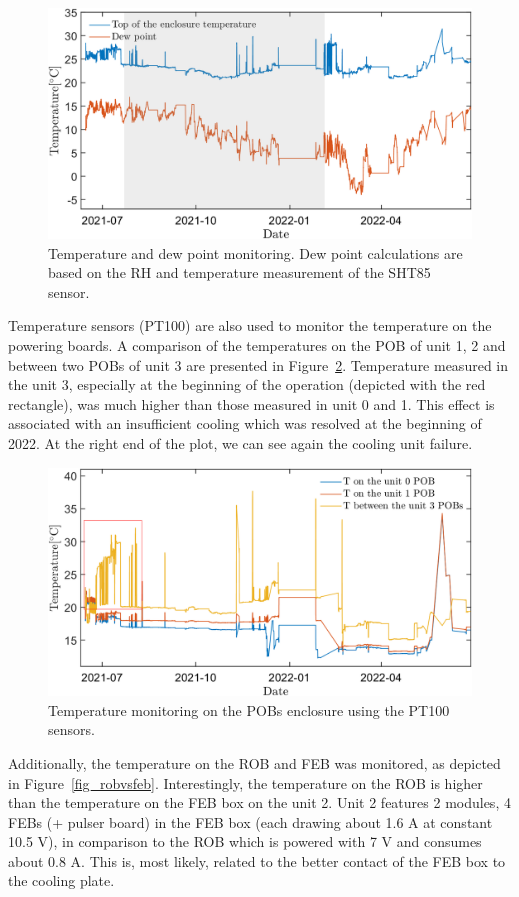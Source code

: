\begin{figure}[!h]
\centering
\includegraphics[width=0.9\columnwidth]{Chapter6/DCS/images/dew.png}
\caption{Temperature and dew point monitoring. Dew point calculations are based on the \gls{RH} and temperature measurement of the SHT85 sensor.}
\label{fig_dew}
\end{figure}


Temperature sensors (PT100) are also used to monitor the temperature on the powering boards. A comparison of the temperatures on the \gls{POB} of unit 1, 2 and between two \glspl{POB} of unit 3 are presented in Figure~\ref{fig_POB1}. Temperature measured in the unit 3, especially at the beginning of the operation (depicted with the red rectangle), was much higher than those measured in unit 0 and 1. This effect is associated with an insufficient cooling which was resolved at the beginning of 2022. At the right end of the plot, we can see again the cooling unit failure. 
\begin{figure}[!h]
\centering
\includegraphics[width=0.9\columnwidth]{Chapter6/DCS/images/POB1.png}
\caption{Temperature monitoring on the \glspl{POB} enclosure using the PT100 sensors.}
\label{fig_POB1}
\end{figure}

Additionally, the temperature on the \gls{ROB} and \gls{FEB} was monitored, as depicted in Figure~\ref{fig_robvsfeb}. Interestingly, the temperature on the \gls{ROB} is higher than the temperature on the \gls{FEB} box on the unit 2. Unit 2 features 2 modules, 4 \gls{FEB}s (+ pulser board) in the \gls{FEB} box (each drawing about 1.6 A at constant 10.5 V), in comparison to the \gls{ROB} which is powered with 7 V and consumes about 0.8 A. This is, most likely, related to the better contact of the \gls{FEB} box to the cooling plate.

